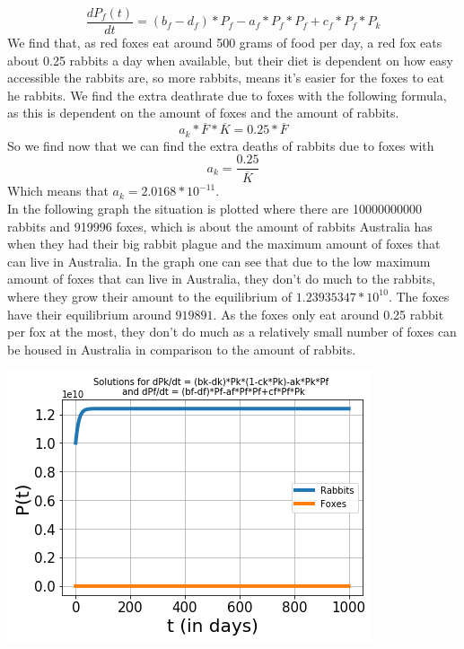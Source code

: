 \documentclass{article}
\begin{document}
$$\frac{dP_f(t)}{dt}=(b_f-d_f)*P_f-a_f*P_f*P_f+c_f*P_f*P_k$$
We find that, as red foxes eat around 500 grams of food per day, a red fox eats about 0.25 rabbits a day when available, but their diet is dependent on how easy accessible the rabbits are, so more rabbits, means it's easier for the foxes to eat he rabbits. We find the extra deathrate due to foxes with the following formula, as this is dependent on the amount of foxes and the amount of rabbits.
$$a_k*\overline{F}*\overline{K}=0.25*\overline{F}$$
So we find now that we can find the extra deaths of rabbits due to foxes with
$$a_k=\frac{0.25}{\overline{K}}$$
Which means that $a_k=2.0168*10^{-11}$.
\\In the following graph the situation is plotted where there are 10000000000 rabbits and 919996 foxes, which is about the amount of rabbits Australia has when they had their big rabbit plague and the maximum amount of foxes that can live in Australia. In the graph one can see that due to the low maximum amount of foxes that can live in Australia, they don't do much to the rabbits, where they grow their amount to the equilibrium of $1.23935347*10^10$. The foxes have their equilibrium around $919891$. As the foxes only eat around 0.25 rabbit per fox at the most, they don't do much as a relatively small number of foxes can be housed in Australia in comparison to the amount of rabbits. 
\begin{center}
    \includegraphics[scale=0.78]{Pictures/RabbitFoxes.png}
\end{center}


\end{document}
